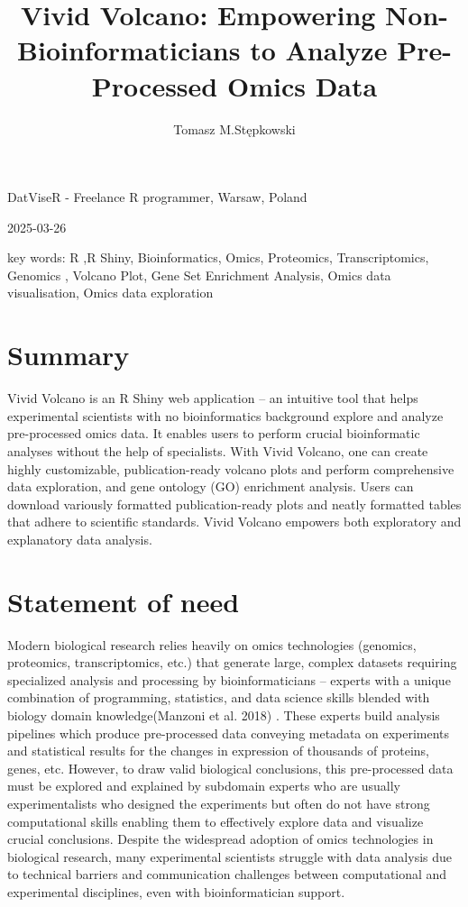 \documentclass[
]{article}
\title{Vivid Volcano: Empowering Non-Bioinformaticians to Analyze
Pre-Processed Omics Data}
\author{Tomasz M.Stępkowski}
\date{}
\begin{document}
\maketitle

DatViseR - Freelance R programmer, Warsaw, Poland

2025-03-26

key words: R ,R Shiny, Bioinformatics, Omics, Proteomics,
Transcriptomics, Genomics , Volcano Plot, Gene Set Enrichment Analysis,
Omics data visualisation, Omics data exploration

\section{Summary}\label{summary}

Vivid Volcano is an R Shiny web application -- an intuitive tool that
helps experimental scientists with no bioinformatics background explore
and analyze pre-processed omics data. It enables users to perform
crucial bioinformatic analyses without the help of specialists. With
Vivid Volcano, one can create highly customizable, publication-ready
volcano plots and perform comprehensive data exploration, and gene
ontology (GO) enrichment analysis. Users can download variously
formatted publication-ready plots and neatly formatted tables that
adhere to scientific standards. Vivid Volcano empowers both exploratory
and explanatory data analysis.

\section{Statement of need}\label{statement-of-need}

Modern biological research relies heavily on omics technologies
(genomics, proteomics, transcriptomics, etc.) that generate large,
complex datasets requiring specialized analysis and processing by
bioinformaticians -- experts with a unique combination of programming,
statistics, and data science skills blended with biology domain
knowledge(Manzoni et al. 2018) . These experts build analysis pipelines
which produce pre-processed data conveying metadata on experiments and
statistical results for the changes in expression of thousands of
proteins, genes, etc. However, to draw valid biological conclusions,
this pre-processed data must be explored and explained by subdomain
experts who are usually experimentalists who designed the experiments
but often do not have strong computational skills enabling them to
effectively explore data and visualize crucial conclusions. Despite the
widespread adoption of omics technologies in biological research, many
experimental scientists struggle with data analysis due to technical
barriers and communication challenges between computational and
experimental disciplines, even with bioinformatician support.
\end{document}
